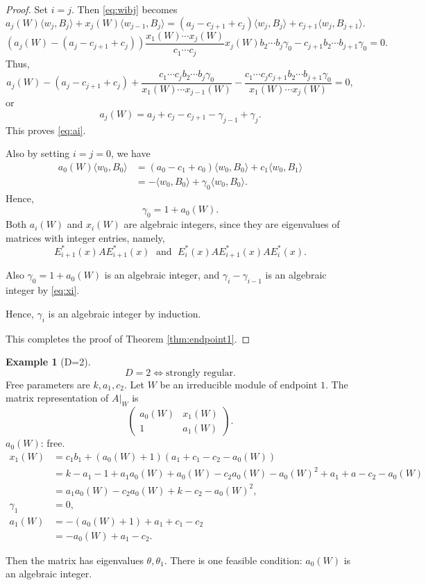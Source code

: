 \documentclass[
]{book}
\theoremstyle{definition}
\theoremstyle{definition}
\newtheorem{example}{Example}[chapter]
\theoremstyle{definition}
\theoremstyle{definition}
\theoremstyle{remark}
\begin{document}
\begin{proof}
Set \(i = j\).
Then \eqref{eq:wibj} becomes
\[
a_j(W)\langle w_j, B_j\rangle + x_{j}(W)\langle w_{j-1}, B_j\rangle
 = (a_j-c_{j+1}+c_j)\langle w_{j},B_j\rangle + c_{j+1}\langle w_{j},B_{j+1}\rangle.
\]
\[
(a_j(W) - (a_j-c_{j+1}+c_j))\frac{x_1(W)\cdots x_j(W)}{c_1\cdots c_j}
x_j(W)b_2\cdots b_j\gamma_0 - c_{j+1}b_2\cdots b_{j+1}\gamma_0 = 0.
\]
Thus,
\[a_j(W)-(a_j-c_{j+1}+c_{j}) + \frac{c_1\cdots c_jb_2\cdots b_j\gamma_0}{x_1(W)\cdots x_{j-1}(W)} - \frac{c_1\cdots c_jc_{j+1}b_2\cdots b_{j+1}\gamma_0}{x_1(W)\cdots x_j(W)} = 0,\]
or
\[a_j(W) = a_j + c_j - c_{j+1} - \gamma_{j-1} + \gamma_j.\]
This proves \eqref{eq:ai}.

Also by setting \(i = j = 0\), we have
\begin{align}
a_0(W)\langle w_0, B_0\rangle & = (a_0-c_1+c_0)\langle w_0, B_0\rangle + c_1\langle w_0, B_1\rangle\\
& = -\langle w_0, B_0\rangle + \gamma_0\langle w_0, B_0\rangle.
\end{align}
Hence,
\[\gamma_0 = 1 + a_0(W).\]
Both \(a_i(W)\) and \(x_i(W)\) are algebraic integers, since they are eigenvalues of matrices with integer entries, namely,
\[E^*_{i+1}(x)AE^*_{i+1}(x) \; \text{ and }\; E^*_i(x)AE^*_{i+1}(x)AE^*_i(x).\]

Also \(\gamma_0 = 1+a_0(W)\) is an algebraic integer, and \(\gamma_i - \gamma_{i-1}\) is an algebraic integer by \eqref{eq:xi}.

Hence, \(\gamma_i\) is an algebraic integer by induction.

This completes the proof of Theorem \ref{thm:endpoint1}.
\end{proof}

\begin{example}[D=2]
\[D = 2 \Leftrightarrow \text{strongly regular}.\]
Free parameters are \(k, a_1, c_2\).
Let \(W\) be an irreducible module of endpoint \(1\).
The matrix representation of \(A|_W\) is
\[\begin{pmatrix}
a_0(W) & x_1(W)\\ 1 & a_1(W)
\end{pmatrix}.\]
\(a_0(W)\): free.
\begin{align}
x_1(W) & = c_1b_1 + (a_0(W) + 1)(a_1 + c_1 - c_2 - a_0(W))\\
& = k - a_1 - 1 + a_1a_0(W) + a_0(W) - c_2a_0(W) - a_0(W)^2 + a_1 + a - c_2 - a_0(W)\\
& = a_1a_0(W) - c_2a_0(W) + k - c_2 - a_0(W)^2,\\
\gamma_1 & = 0,\\
a_1(W) & = -(a_0(W)+1) + a_1 + c_1 - c_2\\
& = -a_0(W) + a_1 - c_2.
\end{align}

Then the matrix has eigenvalues \(\theta, \theta_1\).
There is one feasible condition: \(a_0(W)\) is an algebraic integer.
\end{example}
\end{document}
